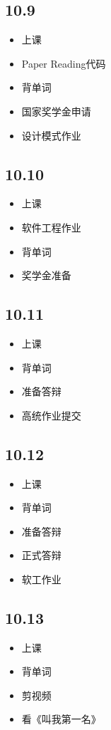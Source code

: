 \documentclass[UTF8]{ctexart}
\begin{document}
\subsection*{10.9}
\begin{itemize}
    \item 上课
    \item Paper Reading代码
    \item 背单词
    \item 国家奖学金申请
    \item 设计模式作业
\end{itemize}

\subsection*{10.10}
\begin{itemize}
    \item 上课
    \item 软件工程作业
    \item 背单词
    \item 奖学金准备
\end{itemize}

\subsection*{10.11}
\begin{itemize}
    \item 上课
    \item 背单词
    \item 准备答辩
    \item 高统作业提交
\end{itemize}

\subsection*{10.12}
\begin{itemize}
    \item 上课
    \item 背单词
    \item 准备答辩
    \item 正式答辩
    \item 软工作业
\end{itemize}

\subsection*{10.13}
\begin{itemize}
    \item 上课
    \item 背单词
    \item 剪视频
    \item 看《叫我第一名》
\end{itemize}
\end{document}
